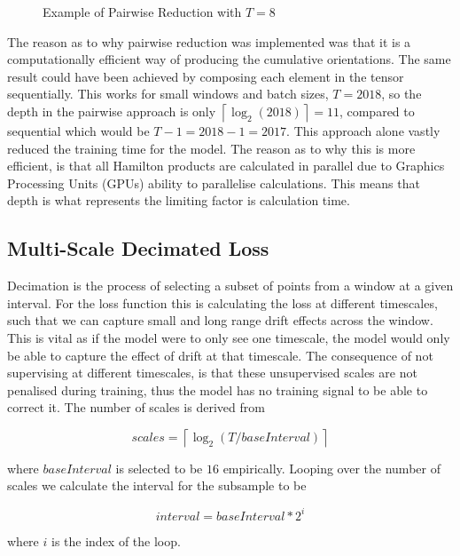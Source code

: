 \begin{figure}[H]
    \centering
    
    \caption{Example of Pairwise Reduction with $T = 8$}
    \label{fig:pairwise}
\end{figure}

The reason as to why pairwise reduction was implemented was that it is a computationally efficient way of producing the cumulative orientations. The same 
result could have been achieved by composing each element in the tensor sequentially. This works for small windows and batch sizes,
$T = 2018$, so the depth in the pairwise approach is only $\left\lceil \log_{2}(2018) \right\rceil = 11$, 
compared to sequential  which would be $T-1 = 2018 - 1 = 2017$.  
This approach alone vastly reduced the training time for the model. The reason as to why this is more efficient, is that all Hamilton products are calculated
in parallel due to Graphics Processing Units (GPUs) ability to parallelise calculations. This means that depth is what represents the limiting factor is 
calculation time. 

\subsection{Multi-Scale Decimated Loss}
Decimation is the process of selecting a subset of points from a window at a given interval. For the loss function this is 
calculating the loss at different timescales, such that we can capture small and long range drift effects across the window. This is vital
as if the model were to only see one timescale, the model would only be able to capture the effect of drift at that timescale. The consequence of not
supervising at different timescales, is that these unsupervised scales are not penalised during training, thus the model has no training signal to be able
to correct it. The number of scales is derived from 

\begin{equation}
    scales = \left\lceil \log_{2}(T / baseInterval) \right\rceil
\end{equation}

where $baseInterval$ is selected to be $16$ empirically. Looping over the number of scales we calculate the interval for the subsample to be

\begin{equation}
    interval = baseInterval * 2^i
\end{equation}

where $i$ is the index of the loop.

